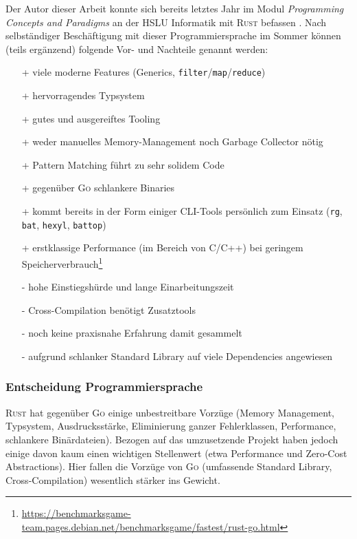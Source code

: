 Der Autor dieser Arbeit konnte sich bereits letztes Jahr im Modul \textit{Programming Concepts and Paradigms} an der HSLU Informatik mit \textsc{Rust} befassen \cite[S. 12]{pcp-rust}. Nach selbständiger Beschäftigung mit dieser Programmiersprache im Sommer können (teils ergänzend) folgende Vor- und Nachteile genannt werden:

\begin{itemize}
    \item[+] viele moderne Features (Generics, \texttt{filter}/\texttt{map}/\texttt{reduce})
    \item[+] hervorragendes Typsystem
    \item[+] gutes und ausgereiftes Tooling
    \item[+] weder manuelles Memory-Management noch Garbage Collector nötig
    \item[+] Pattern Matching führt zu sehr solidem Code
    \item[+] gegenüber \textsc{Go} schlankere Binaries
    \item[+] kommt bereits in der Form einiger CLI-Tools persönlich zum Einsatz (\texttt{rg}, \texttt{bat}, \texttt{hexyl}, \texttt{battop})
    \item[+] erstklassige Performance (im Bereich von C/C++) bei geringem Speicherverbrauch\footnote{\url{https://benchmarksgame-team.pages.debian.net/benchmarksgame/fastest/rust-go.html}}
    \item[-] hohe Einstiegshürde und lange Einarbeitungszeit
    \item[-] Cross-Compilation benötigt Zusatztools
    \item[-] noch keine praxisnahe Erfahrung damit gesammelt
    \item[-] aufgrund schlanker Standard Library auf viele Dependencies angewiesen
\end{itemize}

\subsubsection{Entscheidung Programmiersprache}
\label{sec:Entscheidung-Programmiersprache}

\textsc{Rust} hat gegenüber \textsc{Go} einige unbestreitbare Vorzüge (Memory Management, Typsystem, Ausdrucksstärke, Eliminierung ganzer Fehlerklassen, Performance, schlankere Binärdateien). Bezogen auf das umzusetzende Projekt haben jedoch einige davon kaum einen wichtigen Stellenwert (etwa Performance und Zero-Cost Abstractions). Hier fallen die Vorzüge von \textsc{Go} (umfassende Standard Library, Cross-Compilation) wesentlich stärker ins Gewicht.

